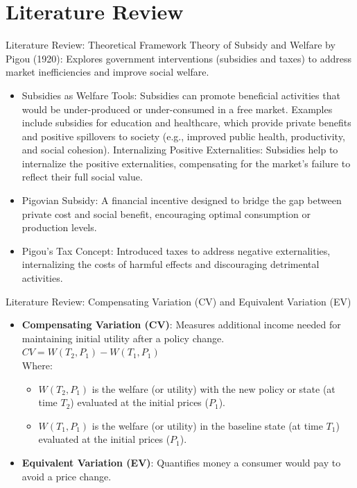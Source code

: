 \documentclass{beamer}
\begin{document}
{\section{Literature Review}
\begin{frame}{Literature Review: Theoretical Framework}
Theory of Subsidy and Welfare by Pigou (1920): Explores government interventions (subsidies and taxes) to address market inefficiencies and improve social welfare.
\begin{itemize}
\item Subsidies as Welfare Tools:
Subsidies can promote beneficial activities that would be under-produced or under-consumed in a free market.
Examples include subsidies for education and healthcare, which provide private benefits and positive spillovers to society (e.g., improved public health, productivity, and social cohesion).
Internalizing Positive Externalities: Subsidies help to internalize the positive externalities, compensating for the market's failure to reflect their full social value.
\item Pigovian Subsidy: A financial incentive designed to bridge the gap between private cost and social benefit, encouraging optimal consumption or production levels.
\item Pigou’s Tax Concept: Introduced taxes to address negative externalities, internalizing the costs of harmful effects and discouraging detrimental activities.
\end{itemize} 
\end{frame}
\begin{frame}{Literature Review: Compensating Variation (CV) and Equivalent Variation (EV)} 
    \begin{itemize} 
        \item \textbf{Compensating Variation (CV)}: Measures additional income needed for maintaining initial utility after a policy change. \\$CV = W(T_2, P_1) - W(T_1, P_1)$ \\
Where:
\begin{itemize}
    \item \( W(T_2, P_1) \) is the welfare (or utility) with the new policy or state (at time \(T_2\)) evaluated at the initial prices (\(P_1\)).
    \item \( W(T_1, P_1) \) is the welfare (or utility) in the baseline state (at time \(T_1\)) evaluated at the initial prices (\(P_1\)).
\end{itemize}
        \item \textbf{Equivalent Variation (EV)}: Quantifies money a consumer would pay to avoid a price change.\\

\end{itemize}
\end{frame}}
\end{document}
